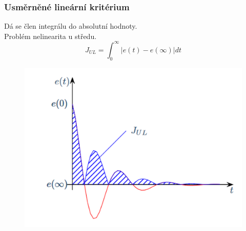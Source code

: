 \subsubsection*{Usměrněné lineární kritérium}
Dá se člen integrálu do absolutní hodnoty.\\
Problém nelinearita u středu.
\begin{equation}
    J_{UL} = \int^\infty_0|e(t) - e(\infty)|dt
\end{equation}
\begin{figure}[H]
    \includegraphics*[scale = 0.3]{images/usmerneneLinearniKriterium.png}
\end{figure}

